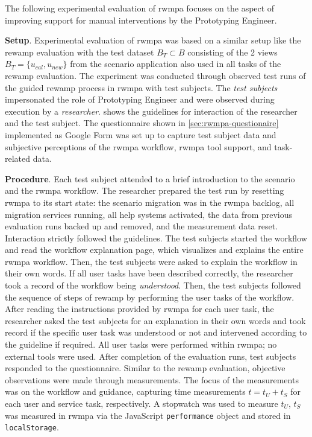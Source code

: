 The following experimental evaluation of \gls{rwmpa} focuses on the aspect of improving support for manual interventions by the Prototyping Engineer.

\textbf{Setup}.
Experimental evaluation of \gls{rwmpa} was based on a similar setup like the \gls{rewamp} evaluation with the test dataset \(B_T \subset B\) consisting of the 2 views \(B_T = \{u_{cal}, u_{new}\}\) from the scenario application also used in all tasks of the \gls{rewamp} evaluation.
The experiment was conducted through observed test runs of the guided \gls{rewamp} process in \gls{rwmpa} with test subjects.
The \emph{test subjects} impersonated the role of Prototyping Engineer and were observed during execution by a \emph{researcher}.
 shows the guidelines for interaction of the researcher and the test subject.
The questionnaire shown in \cref{sec:rwmpa-questionaire} implemented as Google Form was set up to capture test subject data and subjective perceptions of the \gls{rwmpa} workflow, \gls{rwmpa} tool support, and task-related data.

\textbf{Procedure}.
Each test subject attended to a brief introduction to the scenario and the \gls{rwmpa} workflow.
The researcher prepared the test run by resetting \gls{rwmpa} to its start state: the scenario migration was in the \gls{rwmpa} backlog, all migration services running, all help systems activated, the data from previous evaluation runs backed up and removed, and the measurement data reset.
Interaction strictly followed the guidelines.
The test subjects started the workflow and read the workflow explanation page, which visualizes and explains the entire \gls{rwmpa} workflow.
Then, the test subjects were asked to explain the workflow in their own words.
If all user tasks have been described correctly, the researcher took a record of the workflow being \emph{understood}.
Then, the test subjects followed the sequence of steps of \gls{rewamp} by performing the user tasks of the workflow.
After reading the instructions provided by \gls{rwmpa} for each user task, the researcher asked the test subjects for an explanation in their own words and took record if the specific user task was understood or not and intervened according to the guideline if required.
All user tasks were performed within \gls{rwmpa}; no external tools were used.
After completion of the evaluation runs, test subjects responded to the questionnaire.
Similar to the \gls{rewamp} evaluation, objective observations were made through measurements.
The focus of the measurements was on the workflow and guidance, capturing time measurements \(t = t_U + t_S\) for each user and service task, respectively.
A stopwatch was used to measure \(t_U\), \(t_S\) was measured in \gls{rwmpa} via the JavaScript \texttt{performance} object and stored in \texttt{localStorage}.


